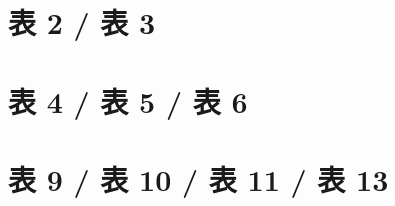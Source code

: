 \documentclass[11pt]{article}
\begin{document}
\section*{表 2 / 表 3}


\clearpage
\section*{表 4 / 表 5 / 表 6}



\clearpage
\section*{表 9 / 表 10 / 表 11 / 表 13}




\clearpage
\end{document}
